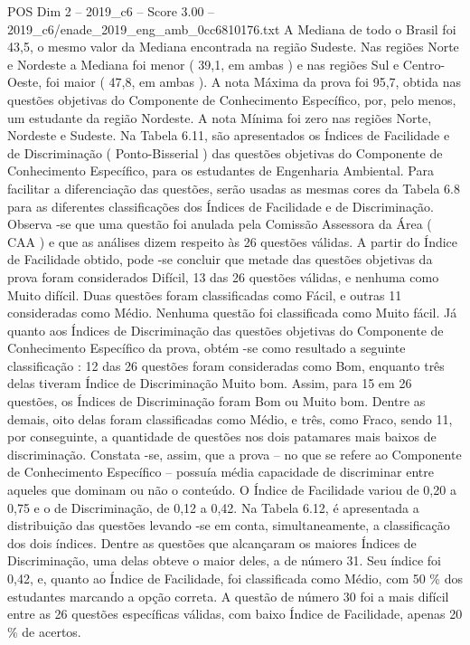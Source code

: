 \begin{textsample}{POS Dim 2 – 2019\_c6 – Score 3.00 – 2019\_c6/enade\_2019\_eng\_amb\_0cc6810176.txt}
A Mediana de todo o Brasil foi 43,5, o mesmo valor da Mediana encontrada na região Sudeste.
Nas regiões Norte e Nordeste a Mediana foi menor ( 39,1, em ambas ) e nas regiões Sul e Centro-Oeste, foi maior ( 47,8, em ambas ).
A nota Máxima da prova foi 95,7, obtida nas questões objetivas do Componente de Conhecimento Específico, por, pelo menos, um estudante da região Nordeste.
A nota Mínima foi zero nas regiões Norte, Nordeste e Sudeste.
Na Tabela 6.11, são apresentados os Índices de Facilidade e de Discriminação ( Ponto-Bisserial ) das questões objetivas do Componente de Conhecimento Específico, para os estudantes de Engenharia Ambiental.
Para facilitar a diferenciação das questões, serão usadas as mesmas cores da Tabela 6.8 para as diferentes classificações dos Índices de Facilidade e de Discriminação.
Observa -se que uma questão foi anulada pela Comissão Assessora da Área ( CAA ) e que as análises dizem respeito às 26 questões válidas.
A partir do Índice de Facilidade obtido, pode -se concluir que metade das questões objetivas da prova foram considerados Difícil, 13 das 26 questões válidas, e nenhuma como Muito difícil.
Duas questões foram classificadas como Fácil, e outras 11 consideradas como Médio.
Nenhuma questão foi classificada como Muito fácil.
Já quanto aos Índices de Discriminação das questões objetivas do Componente de Conhecimento Específico da prova, obtém -se como resultado a seguinte classificação : 12 das 26 questões foram consideradas como Bom, enquanto três delas tiveram Índice de Discriminação Muito bom.
Assim, para 15 em 26 questões, os Índices de Discriminação foram Bom ou Muito bom.
Dentre as demais, oito delas foram classificadas como Médio, e três, como Fraco, sendo 11, por conseguinte, a quantidade de questões nos dois patamares mais baixos de discriminação.
Constata -se, assim, que a prova – no que se refere ao Componente de Conhecimento Específico – possuía média capacidade de discriminar entre aqueles que dominam ou não o conteúdo.
O Índice de Facilidade variou de 0,20 a 0,75 e o de Discriminação, de 0,12 a 0,42.
Na Tabela 6.12, é apresentada a distribuição das questões levando -se em conta, simultaneamente, a classificação dos dois índices.
Dentre as questões que alcançaram os maiores Índices de Discriminação, uma delas obteve o maior deles, a de número 31.
Seu índice foi 0,42, e, quanto ao Índice de Facilidade, foi classificada como Médio, com 50 \% dos estudantes marcando a opção correta.
A questão de número 30 foi a mais difícil entre as 26 questões específicas válidas, com baixo Índice de Facilidade, apenas 20 \% de acertos.

\end{textsample}
